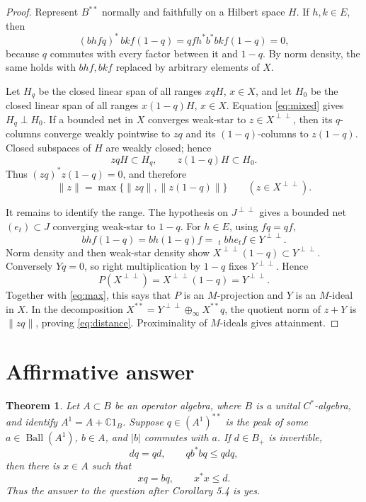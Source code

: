 \documentclass[11pt]{article}
\newtheorem{theorem}{Theorem}
\newcommand{\Ball}{\operatorname{Ball}}
\begin{document}
\begin{proof}
Represent $B^{**}$ normally and faithfully on a Hilbert space $H$.  If
$h,k\in E$, then
\begin{equation}\label{eq:mixed}
 (bhfq)^*\,bkf(1-q)=qfh^*b^*bkf(1-q)=0,
\end{equation}
because $q$ commutes with every factor between it and $1-q$.  By norm
density, the same holds with $bhf,bkf$ replaced by arbitrary elements of
$X$.

Let $H_q$ be the closed linear span of all ranges $xqH$, $x\in X$, and let
$H_0$ be the closed linear span of all ranges $x(1-q)H$, $x\in X$.
Equation \eqref{eq:mixed} gives $H_q\perp H_0$.  If a bounded net in $X$
converges weak-star to $z\in X^{\perp\perp}$, then its $q$-columns converge
weakly pointwise to $zq$ and its $(1-q)$-columns to $z(1-q)$.  Closed
subspaces of $H$ are weakly closed; hence
\[
 zqH\subset H_q,\qquad z(1-q)H\subset H_0.
\]
Thus $(zq)^*z(1-q)=0$, and therefore
\begin{equation}\label{eq:max}
 \|z\|=\max\{\|zq\|,\|z(1-q)\|\}
 \qquad(z\in X^{\perp\perp}).
\end{equation}

It remains to identify the range.  The hypothesis on $J^{\perp\perp}$ gives
a bounded net $(e_t)\subset J$ converging weak-star to $1-q$.  For $h\in E$,
using $fq=qf$,
\[
 bhf(1-q)=bh(1-q)f=\mathop{\mathrm{w^*\!\!-lim}}_t bhe_tf\in
 Y^{\perp\perp}.
\]
Norm density and then weak-star density show
$X^{\perp\perp}(1-q)\subset Y^{\perp\perp}$.  Conversely $Yq=0$, so right
multiplication by $1-q$ fixes $Y^{\perp\perp}$.  Hence
\[
 P(X^{\perp\perp})=X^{\perp\perp}(1-q)=Y^{\perp\perp}.
\]
Together with \eqref{eq:max}, this says that $P$ is an $M$-projection and
$Y$ is an $M$-ideal in $X$.  In the decomposition
$X^{**}=Y^{\perp\perp}\oplus_\infty X^{**}q$, the quotient norm of $z+Y$ is
$\|zq\|$, proving \eqref{eq:distance}.  Proximinality of $M$-ideals gives
attainment.
\end{proof}

\section{Affirmative answer}

\begin{theorem}\label{thm:answer}
Let $A\subset B$ be an operator algebra, where $B$ is a unital $C^*$-algebra,
and identify $A^1=A+\mathbb C1_B$.  Suppose $q\in(A^1)^{**}$ is the peak of
some $a\in\Ball(A^1)$, $b\in A$, and $|b|$ commutes with $a$.  If
$d\in B_+$ is invertible,
\[
 dq=qd,\qquad qb^*bq\le qdq,
\]
then there is $x\in A$ such that
\[
 xq=bq,\qquad x^*x\le d.
\]
Thus the answer to the question after Corollary 5.4 is yes.
\end{theorem}
\end{document}
